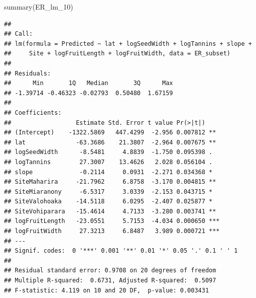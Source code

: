 \documentclass[
  12pt,
]{article}
\newenvironment{Shaded}{\begin{snugshade}}{\end{snugshade}}
\newcommand{\FunctionTok}[1]{\textcolor[rgb]{0.00,0.00,0.00}{#1}}
\newcommand{\NormalTok}[1]{#1}
\begin{document}
\begin{Shaded}
\begin{Highlighting}[]
\FunctionTok{summary}\NormalTok{(ER\_lm\_10)}
\end{Highlighting}
\end{Shaded}

\begin{verbatim}
## 
## Call:
## lm(formula = Predicted ~ lat + logSeedWidth + logTannins + slope + 
##     Site + logFruitLength + logFruitWidth, data = ER_subset)
## 
## Residuals:
##      Min       1Q   Median       3Q      Max 
## -1.39714 -0.46323 -0.02793  0.50480  1.67159 
## 
## Coefficients:
##                  Estimate Std. Error t value Pr(>|t|)    
## (Intercept)    -1322.5869   447.4299  -2.956 0.007812 ** 
## lat              -63.3686    21.3807  -2.964 0.007675 ** 
## logSeedWidth      -8.5481     4.8839  -1.750 0.095398 .  
## logTannins        27.3007    13.4626   2.028 0.056104 .  
## slope             -0.2114     0.0931  -2.271 0.034368 *  
## SiteMaharira     -21.7962     6.8758  -3.170 0.004815 ** 
## SiteMiaranony     -6.5317     3.0339  -2.153 0.043715 *  
## SiteValohoaka    -14.5118     6.0295  -2.407 0.025877 *  
## SiteVohiparara   -15.4614     4.7133  -3.280 0.003741 ** 
## logFruitLength   -23.0551     5.7153  -4.034 0.000650 ***
## logFruitWidth     27.3213     6.8487   3.989 0.000721 ***
## ---
## Signif. codes:  0 '***' 0.001 '**' 0.01 '*' 0.05 '.' 0.1 ' ' 1
## 
## Residual standard error: 0.9708 on 20 degrees of freedom
## Multiple R-squared:  0.6731, Adjusted R-squared:  0.5097 
## F-statistic: 4.119 on 10 and 20 DF,  p-value: 0.003431
\end{verbatim}
\end{document}
